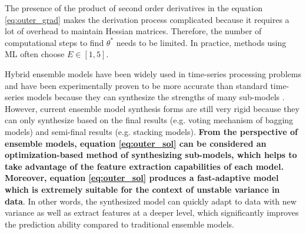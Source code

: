 The presence of the product of second order derivatives in the equation \ref{eq:outer_grad} makes the derivation process complicated because it requires a lot of overhead to maintain Hessian matrices. Therefore, the number of computational steps to find $\theta^*$ needs to be limited. In practice, methods using ML \cite{fallah2020personalized, chen2018federated, nguyen2022meta,finn2017model, li2017meta} often choose $E\in [1,5]$.


Hybrid ensemble models have been widely used in time-series processing problems and have been experimentally proven to be more accurate than standard time-series models because they can synthesize the strengths of many sub-models \cite{ayitey2023forex}. However, current ensemble model synthesis forms are still very rigid because they can only synthesize based on the final results (e.g. voting mechanism of bagging models) and semi-final results (e.g. stacking models). \textbf{From the perspective of ensemble models, equation \ref{eq:outer_sol} can be considered an optimization-based method of synthesizing sub-models, which helps to take advantage of the feature extraction capabilities of each model. Moreover, equation \ref{eq:outer_sol} produces a fast-adaptive model which is extremely suitable for the context of unstable variance in data}. In other words, the synthesized model can quickly adapt to data with new variance as well as extract features at a deeper level, which significantly improves the prediction ability compared to traditional ensemble models.
